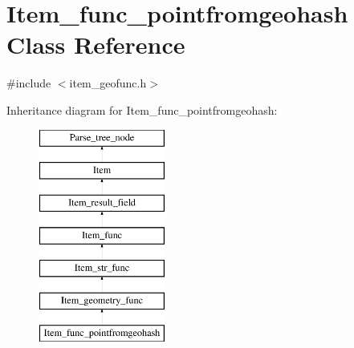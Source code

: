 \hypertarget{classItem__func__pointfromgeohash}{}\section{Item\+\_\+func\+\_\+pointfromgeohash Class Reference}
\label{classItem__func__pointfromgeohash}


{\ttfamily \#include $<$item\+\_\+geofunc.\+h$>$}

Inheritance diagram for Item\+\_\+func\+\_\+pointfromgeohash\+:\begin{figure}[H]
\begin{center}
\leavevmode
\includegraphics[height=7.000000cm]{classItem__func__pointfromgeohash}
\end{center}
\end{figure}
